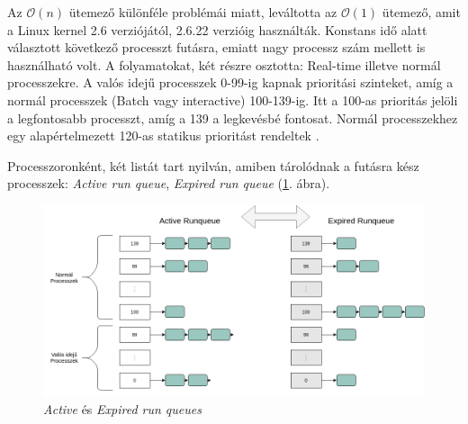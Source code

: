 
Az $\mathcal{O}(n)$ ütemező különféle problémái miatt, leváltotta az $\mathcal{O}(1)$ ütemező, amit a Linux kernel 2.6 verziójától, 2.6.22 verzióig használták. 
Konstans idő alatt választott következő processzt futásra, emiatt nagy processz szám mellett is használható volt.
A folyamatokat, két részre osztotta: Real-time illetve normál processzekre. A valós idejű processzek 0-99-ig kapnak prioritási szinteket, amíg a normál processzek (Batch vagy interactive) 100-139-ig. Itt a 100-as prioritás jelöli a legfontosabb processzt, amíg a 139 a legkevésbé fontosat. Normál processzekhez egy alapértelmezett 120-as statikus prioritást rendeltek \cite{wong2008fairness, rebeiro2020scheduling}.

Processzoronként, két listát tart nyilván, amiben tárolódnak a futásra kész processzek: \textit{Active run queue}, \textit{Expired run queue} (\ref{fig:activeExpiredRunqueue}. ábra).

\begin{figure}[h]
\centering
\includegraphics[width=\textwidth]{images/activeExpiredRunqueue.png}
\caption{\textit{Active} és \textit{Expired run queues}}
\label{fig:activeExpiredRunqueue}
\end{figure}

